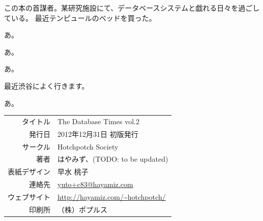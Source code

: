 \documentclass[b5paper,papersize,tombow,10pt]{jsbook}
\begin{document}
 \quad
この本の首謀者。某研究施設にて、データベースシステムと戯れる日々を過ごしている。
最近テンピュールのベッドを買った。

 \quad
あ。

 \quad
あ。

 \quad
あ。

 \quad
最近渋谷によく行きます。

 \quad
あ。


\vspace*{15\Cvs}

\begin{center}
 \par\vspace*{1mm}
 \begin{tabular}{rl}
  \hline
  タイトル & The Database Times vol.2 \\
  発行日 & 2012年12月31日 初版発行 \\
  サークル & Hotchpotch Society \\
  著者 & はやみず、(TODO: to be updated) \\
  表紙デザイン & 早水 桃子 \\
  連絡先 & \url{yuto+c83@hayamiz.com} \\
  ウェブサイト & \url{http://hayamiz.com/~hotchpotch/} \\
  印刷所 & （株）ポプルス \\
  \hline
 \end{tabular}
\end{center}
\end{document}
